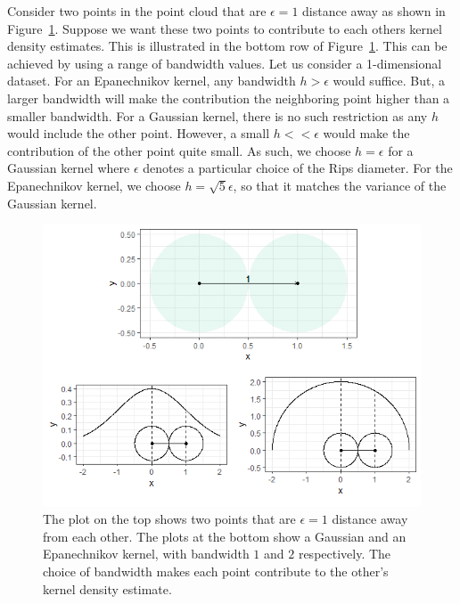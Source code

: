 \documentclass[letter,12pt]{article}
\begin{document}
Consider two points in the point cloud that are $\epsilon = 1$ distance away as shown in Figure~\ref{fig:epsilonandkernels}. Suppose we want these two points to contribute to each others kernel density estimates. This is illustrated in the bottom row of Figure~\ref{fig:epsilonandkernels}. This can be achieved by using a range of bandwidth values. Let us consider a 1-dimensional dataset. For an Epanechnikov kernel, any bandwidth $h > \epsilon $ would suffice. But, a larger bandwidth will make the contribution the neighboring point higher than a smaller bandwidth. For a Gaussian kernel, there is no such restriction as any $h$ would include the other point. However, a small $h < < \epsilon$ would make the contribution of the other point quite small. As such, we choose $h=\epsilon$ for a Gaussian kernel where $\epsilon$ denotes a particular choice of the Rips diameter. For the Epanechnikov kernel, we choose $h = \sqrt{5} \epsilon$, so that it matches the variance of the Gaussian kernel.  

\begin{figure}[!ht]
    \centering
    \includegraphics[scale=0.8]{Graphics/circles_and_kernels.png}
    \caption{The plot on the top shows two points that are  $\epsilon = 1$ distance away from each other. The plots at the bottom show a Gaussian and an Epanechnikov kernel, with bandwidth $1$ and $2$ respectively. The choice of bandwidth makes each point contribute to the other's kernel density estimate. }
    \label{fig:epsilonandkernels}
\end{figure}
\end{document}
